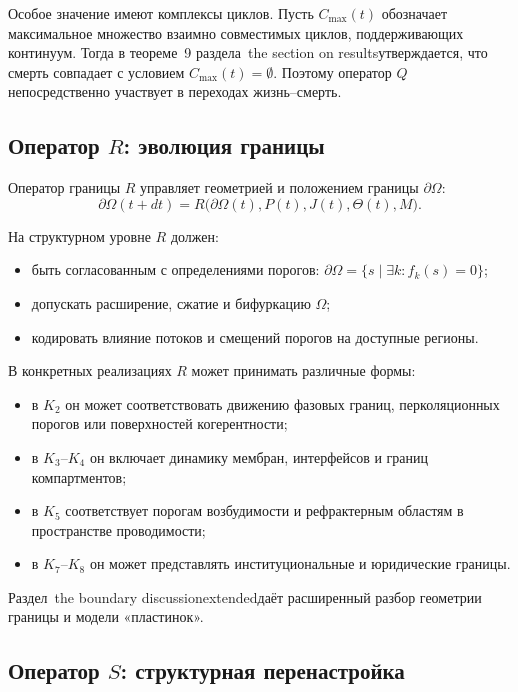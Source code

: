 Особое значение имеют комплексы циклов. Пусть \(C_{\max}(t)\) обозначает
максимальное множество взаимно совместимых циклов, поддерживающих континуум.
Тогда в теореме~9 раздела~the section on resultsутверждается, что смерть
совпадает с условием \(C_{\max}(t) = \emptyset\). Поэтому оператор \(Q\)
непосредственно участвует в переходах жизнь–смерть.

\subsection{Оператор \texorpdfstring{\texorpdfstring{$R$}{R}}{R}: эволюция границы}

Оператор границы \(R\) управляет геометрией и положением границы
\(\partial\Omega\):
\[
  \partial\Omega(t+dt) =
    R\big(\partial\Omega(t), P(t), J(t), \Theta(t), M\big).
\]

На структурном уровне \(R\) должен:
\begin{itemize}
  \item быть согласованным с определениями порогов:
        \(\partial\Omega = \{ s \mid \exists k: f_k(s) = 0 \}\);
  \item допускать расширение, сжатие и бифуркацию \(\Omega\);
  \item кодировать влияние потоков и смещений порогов на доступные регионы.
\end{itemize}

В конкретных реализациях \(R\) может принимать различные формы:
\begin{itemize}
  \item в \(K_2\) он может соответствовать движению фазовых границ,
        перколяционных порогов или поверхностей когерентности;
  \item в \(K_3\)–\(K_4\) он включает динамику мембран, интерфейсов и
        границ компартментов;
  \item в \(K_5\) соответствует порогам возбудимости и рефрактерным
        областям в пространстве проводимости;
  \item в \(K_7\)–\(K_8\) он может представлять институциональные и
        юридические границы.
\end{itemize}

Раздел~the boundary discussionextendedдаёт расширенный разбор геометрии
границы и модели «пластинок».

\subsection{Оператор \texorpdfstring{\texorpdfstring{$S$}{S}}{S}: структурная
перенастройка}

